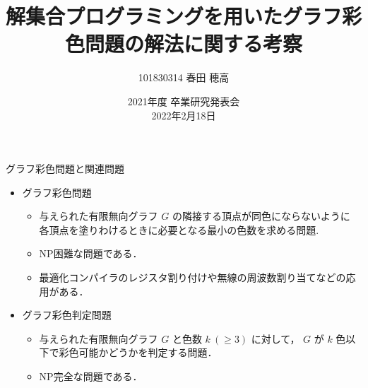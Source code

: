 \documentclass[dvipdfmx,11pt]{beamer}
\title{解集合プログラミングを用いたグラフ彩色問題の解法に関する考察}
\author{101830314 春田 穂高}
\institute{番原研究室}
\date{2021年度 卒業研究発表会\\2022年2月18日}
\begin{document}
\frame{\maketitle}

\begin{frame}{グラフ彩色問題と関連問題}

 \begin{itemize}
  \item \alert{グラフ彩色問題}
        \begin{itemize}
	 \item 与えられた有限無向グラフ $G$ の隣接する頂点が同色にならないように
	       各頂点を塗りわけるときに必要となる最小の色数を求める問題.
         \item NP困難な問題である．
	 \item 最適化コンパイラのレジスタ割り付けや無線の周波数割り当てなどの応用がある．
        \end{itemize}
  \item \alert{グラフ彩色判定問題}
        \begin{itemize}
         \item 与えられた有限無向グラフ $G$ と色数 $k\ (\geq 3)$ に対して，
               $G$ が $k$ 色以下で彩色可能かどうかを判定する問題．
         \item NP完全な問題である．
        \end{itemize}
 \end{itemize}
 
\end{frame}

\end{document}
